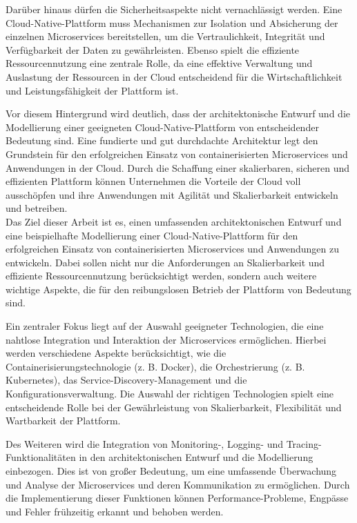 Darüber hinaus dürfen die Sicherheitsaspekte nicht vernachlässigt werden. Eine Cloud-Native-Plattform muss Mechanismen zur Isolation und Absicherung der einzelnen Microservices bereitstellen, um die Vertraulichkeit, Integrität und Verfügbarkeit der Daten zu gewährleisten. Ebenso spielt die effiziente Ressourcennutzung eine zentrale Rolle, da eine effektive Verwaltung und Auslastung der Ressourcen in der Cloud entscheidend für die Wirtschaftlichkeit und Leistungsfähigkeit der Plattform ist.

Vor diesem Hintergrund wird deutlich, dass der architektonische Entwurf und die Modellierung einer geeigneten Cloud-Native-Plattform von entscheidender Bedeutung sind. Eine fundierte und gut durchdachte Architektur legt den Grundstein für den erfolgreichen Einsatz von containerisierten Microservices und Anwendungen in der Cloud. Durch die Schaffung einer skalierbaren, sicheren und effizienten Plattform können Unternehmen die Vorteile der Cloud voll ausschöpfen und ihre Anwendungen mit Agilität und Skalierbarkeit entwickeln und betreiben.
\\

Das Ziel dieser Arbeit ist es, einen umfassenden architektonischen Entwurf und eine beispielhafte Modellierung einer Cloud-Native-Plattform für den erfolgreichen Einsatz von containerisierten Microservices und Anwendungen zu entwickeln. Dabei sollen nicht nur die Anforderungen an Skalierbarkeit und effiziente Ressourcennutzung berücksichtigt werden, sondern auch weitere wichtige Aspekte, die für den reibungslosen Betrieb der Plattform von Bedeutung sind.

Ein zentraler Fokus liegt auf der Auswahl geeigneter Technologien, die eine nahtlose Integration und Interaktion der Microservices ermöglichen. Hierbei werden verschiedene Aspekte berücksichtigt, wie die Containerisierungstechnologie (z. B. Docker), die Orchestrierung (z. B. Kubernetes), das Service-Discovery-Management und die Konfigurationsverwaltung. Die Auswahl der richtigen Technologien spielt eine entscheidende Rolle bei der Gewährleistung von Skalierbarkeit, Flexibilität und Wartbarkeit der Plattform.

Des Weiteren wird die Integration von Monitoring-, Logging- und Tracing-Funktionalitäten in den architektonischen Entwurf und die Modellierung einbezogen. Dies ist von großer Bedeutung, um eine umfassende Überwachung und Analyse der Microservices und deren Kommunikation zu ermöglichen. Durch die Implementierung dieser Funktionen können Performance-Probleme, Engpässe und Fehler frühzeitig erkannt und behoben werden.

